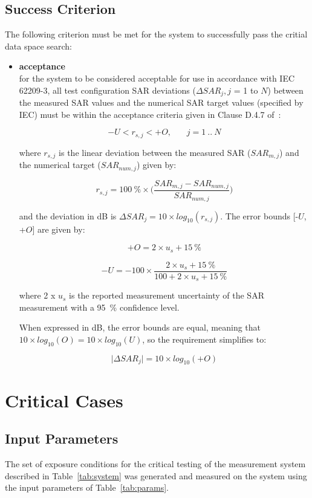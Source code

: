 \documentclass{article}
\begin{document}
\subsection{Success Criterion}\label{sec:quantities}

The following criterion must be met for the system to successfully pass the critial data space search:

\begin{itemize}
\item \textbf{acceptance}\\ for the system to be considered acceptable for use in accordance with IEC 62209-3, all test configuration SAR deviations ($\Delta SAR_j, j$ = 1 to $N$) between the measured SAR values and the numerical SAR target values (specified by IEC) must be within the acceptance criteria given in Clause D.4.7 of~\cite{standard}:

\[
-U < r_{s,j} < +O, ~~~~~~~~ j = 1~..~N
\]

where $r_{s,j}$ is the linear deviation between the measured SAR ($SAR_{m,j}$) and the numerical target ($SAR_{num,j}$) given by:

\[
r_{s,j} = 100~\% \times \Big(\frac{SAR_{m,j} - SAR_{num,j}}{SAR_{num,j}}\Big)
\]

and the deviation in dB is $\Delta SAR_j = 10 \times log_{10} (r_{s,j})$. The error bounds [-$U$, +$O$] are given by:

\[
+O = 2 \times u_s + 15~\%
\]

\[
-U = -100 \times \frac{2 \times u_s + 15~\%}{100 + 2 \times u_s + 15~\%}
\]

where 2 x $u_s$ is the reported measurement uncertainty of the SAR measurement with a 95~\% confidence level.

When expressed in dB, the error bounds are equal, meaning that $10 \times log_{10}(O) = 10 \times log_{10}(U)$, so the requirement simplifies to:

\[
\big|\Delta SAR_j\big| = 10 \times log_{10}(+O)
\]
\end{itemize}

\section{Critical Cases}

\subsection{Input Parameters}
The set of exposure conditions for the critical testing of the measurement system described in Table~\ref{tab:system} was generated and measured on the system using the input parameters of Table~\ref{tab:params}.
\end{document}
